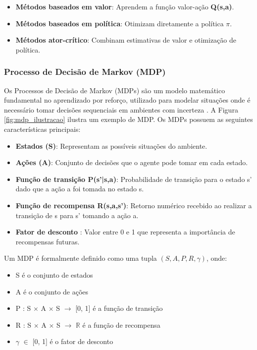 \begin{itemize}
\item \textbf{Métodos baseados em valor}: Aprendem a função valor-ação \textbf{Q(s,a)}.
\item \textbf{Métodos baseados em política}: Otimizam diretamente a política \textbf{$\pi$}.
\item \textbf{Métodos ator-crítico}: Combinam estimativas de valor e otimização de política.
\end{itemize}

\subsubsection{Processo de Decisão de Markov (MDP)}
\label{subsubsec:mdp}

Os Processos de Decisão de Markov (MDPs) são um modelo matemático fundamental no aprendizado por reforço, utilizado para modelar situações onde é necessário tomar decisões sequenciais em ambientes com incerteza \cite{introducao_modelos_probabilisticos}. A Figura \ref{fig:mdp_ilustracao} ilustra um exemplo de MDP. Os MDPs possuem as seguintes características principais:

\begin{itemize}
\item \textbf{Estados (S)}: Representam as possíveis situações do ambiente.
\item \textbf{Ações (A)}: Conjunto de decisões que o agente pode tomar em cada estado.
\item \textbf{Função de transição P(s'|s,a)}: Probabilidade de transição para o estado s' dado que a ação a foi tomada no estado s.
\item \textbf{Função de recompensa R(s,a,s')}: Retorno numérico recebido ao realizar a transição de s para s' tomando a ação a.
\item \textbf{Fator de desconto \gamma}: Valor entre 0 e 1 que representa a importância de recompensas futuras.
\end{itemize}

Um MDP é formalmente definido como uma tupla $(S, A, P, R, \gamma)$, onde:

\begin{itemize}
\item S é o conjunto de estados
\item A é o conjunto de ações
\item P : S $\times$ A $\times$ S $\rightarrow$ [0, 1] é a função de transição
\item R : S $\times$ A $\times$ S $\rightarrow$ \(\mathbb{R}\) é a função de recompensa
\item \(\gamma\) \(\in\) [0, 1] é o fator de desconto
\end{itemize}

